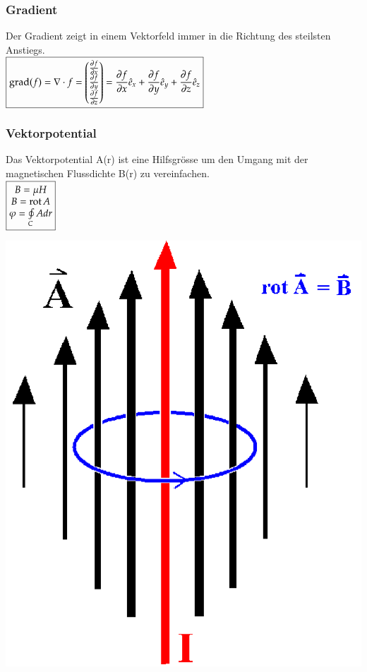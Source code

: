 \subsubsection{Gradient }
Der Gradient zeigt in einem Vektorfeld immer in die Richtung des steilsten Anstiegs. \\

$\boxed{\operatorname{grad}(f)= \nabla \cdot f= 	
	\begin{pmatrix}
	\frac{\partial f}{\partial x}\\
	\frac{\partial f}{\partial y}\\
	\frac{\partial f}{\partial z}
	\end{pmatrix} ={\frac {\partial f}{\partial x}}{\hat {e}}_{x}+{\frac {\partial f}{\partial y}}{\hat {e}}_{y}+{\frac {\partial f}{\partial z}}{\hat {e}}_{z} }$

\subsubsection{Vektorpotential }
\begin{minipage}{0.7\linewidth}
Das Vektorpotential A(r) ist eine Hilfsgrösse um den Umgang mit der magnetischen Flussdichte B(r) zu vereinfachen. \\
	$\boxed{\begin{matrix}
		B=\mu H\\
		B=\operatorname{rot} A\\
		\varphi=\oint\limits_{C}A dr
		\end{matrix}}$
\end{minipage}
\begin{minipage}{0.3\linewidth}
    \includegraphics[width=0.5\linewidth]{images/rotA}
\end{minipage}
